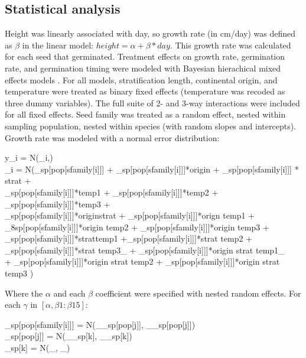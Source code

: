 \documentclass[12pt]{article}\usepackage[]{graphicx}\usepackage[]{color}
\begin{document}
	\subsection{Statistical analysis}
	Height was linearly associated with day, so growth rate (in cm/day) was defined as $\beta$ in the linear model: $height = \alpha + \beta*day $. This growth rate was calculated for each seed that germinated. Treatment effects on growth rate, germination rate, and germination timing were modeled with Bayesian hierachical mixed effects models \parencite{Gelman2004}. For all models, stratification length, continental origin, and temperature were treated as binary fixed effects (temperature was recoded as three dummy variables). The full suite of 2- and 3-way interactions were included for all fixed effects. Seed family was treated as a random effect, nested within sampling population, nested within species (with random slopes and intercepts). Growth rate was modeled with a normal error distribution: 
	\begin{center}
	\begin{multiple}
	\displaystyle y_i = N(\mu_i,\sigma) \\
	\mu_i = N(\alpha_{sp[pop[sfamily[i]]]} + _{sp[pop[sfamily[i]]]}*origin + _{sp[pop[sfamily[i]]]} * strat + \\ 
	_{sp[pop[sfamily[i]]]}*temp1 + _{sp[pop[sfamily[i]]]}*temp2 + _{sp[pop[sfamily[i]]]}*temp3 + \\
	_{sp[pop[sfamily[i]]]}*origin\times strat  + _{sp[pop[sfamily[i]]]}*orign \times temp1 +  \\
	\beta_8{sp[pop[sfamily[i]]]}*origin \times temp2 + _{sp[pop[sfamily[i]]]}*origin \times temp3 + \\
	_{sp[pop[sfamily[i]]]}*strat\times temp1 +_{sp[pop[sfamily[i]]]}*strat \times temp2 + \\
	_{sp[pop[sfamily[i]]]}*strat \times temp3_ + _{sp[pop[sfamily[i]]]}*origin \times strat \times temp1_ \\
	+ _{sp[pop[sfamily[i]]]}*origin \times strat \times temp2 + _{sp[pop[sfamily[i]]]}*origin \times strat \times temp3 )
	\end{multiple}
	\end{center}
 Where the $\alpha$ and each $\beta$ coefficient were specified with nested random effects. For each $\gamma$ in $[\alpha,\beta 1:\beta 15]$:
\par 
\begin{center}
\begin{multiple}
	\displaystyle \gamma_{sp[pop[sfamily[i]]]} = N(\mu_{\gamma_{sp[pop[j]]}}, \sigma_{\gamma_{sp[pop[j]]}}) \\
	\gamma_{sp[pop[j]]} = N(\mu_{\gamma_{sp[k]}}, \sigma_{\gamma_{sp[k]}}) \\
	\gamma_{sp[k]} = N(\mu_{\gamma}, \sigma_{\gamma})
	\end{multiple}
	\end{center}
\end{document}
